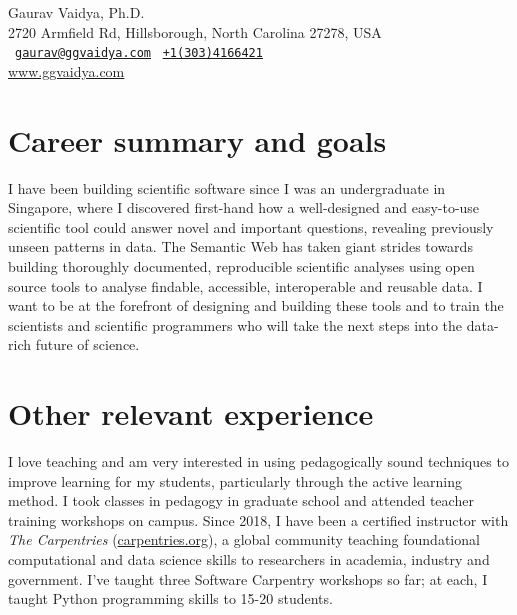 \documentclass[12pt,letter]{article}
\begin{document}
\thispagestyle{plain}

\begin{center}

{\selectfont
\Large Gaurav Vaidya, Ph.D. \\
\small
2720 Armfield Rd, Hillsborough, North Carolina 27278, USA \\
\Letter~{\tt \href{mailto:gaurav@ggvaidya.com}{gaurav@ggvaidya.com}}
\hspace{0.25em}
\Telefon~{\tt \href{tel:+13034166421}{+1\hspace{0.3em}(303)\hspace{0.3em}416\hspace{0.3em}6421}\hspace{0.3em}} \\
\url{www.ggvaidya.com}
}

\vspace{-1em}

\end{center}

\normalfont

\selectfont

\part{Career summary and goals}

I have been building scientific software since I was an undergraduate in Singapore, where I discovered first-hand how a well-designed and easy-to-use scientific tool could answer novel and important questions, revealing previously unseen patterns in data. The Semantic Web has taken giant strides towards building thoroughly documented, reproducible scientific analyses using open source tools to analyse findable, accessible, interoperable and reusable data. I want to be at the forefront of designing and building these tools and to train the scientists and scientific programmers who will take the next steps into the data-rich future of science.





\part{Other relevant experience}

I love teaching and am very interested in using pedagogically sound techniques to improve learning for my students, particularly through the active learning method. I took classes in pedagogy in graduate school and attended teacher training workshops on campus. Since 2018, I have been a certified instructor with \textit{The Carpentries} (\href{https://carpentries.org/}{carpentries.org}), a global community teaching foundational computational and data science skills to researchers in academia, industry and government. I've taught three Software Carpentry workshops so far; at each, I taught Python programming skills to 15-20 students.
\end{document}
